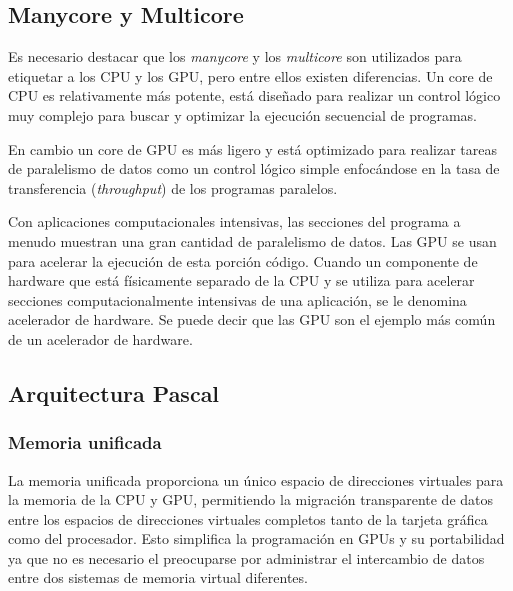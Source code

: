     \subsection{Manycore y Multicore}
    Es necesario destacar que los \textit{manycore} y los \textit{multicore} son utilizados para etiquetar a los CPU y los GPU, pero entre ellos existen diferencias. Un core de CPU es relativamente más potente, está diseñado para realizar un control lógico muy complejo para buscar y optimizar la ejecución secuencial de programas.
   
    \vspace{0.3cm}
    En cambio un core de GPU es más ligero y está optimizado para realizar tareas de paralelismo de datos como un control lógico simple enfocándose en la tasa de transferencia (\textit{throughput}) de los programas paralelos.
    
    \vspace{0.3cm}
    Con aplicaciones computacionales intensivas, las secciones del programa a menudo muestran una gran cantidad de paralelismo de datos. Las GPU se usan para acelerar la ejecución de esta porción código. Cuando un componente de hardware que está físicamente separado de la CPU y se utiliza para acelerar secciones computacionalmente intensivas de una aplicación, se le denomina acelerador de hardware. Se puede decir que las GPU son el ejemplo más común de un acelerador de hardware.

    \subsection{Arquitectura Pascal}

     
    \subsubsection{Memoria unificada} 
     La memoria unificada proporciona un único espacio de direcciones virtuales para la memoria de la CPU y GPU, permitiendo la migración transparente de datos entre los espacios de direcciones virtuales completos tanto de la tarjeta gráfica como del procesador. Esto simplifica la programación en GPUs y su portabilidad ya que no es necesario el  preocuparse por administrar el intercambio de datos entre dos sistemas de memoria virtual diferentes\cite{WPNV}.
     
     
